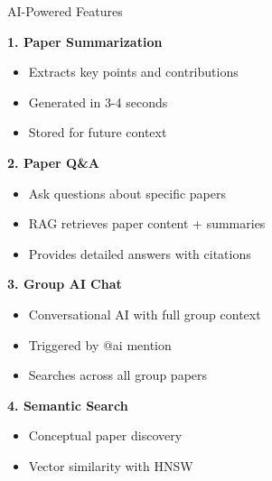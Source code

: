 \documentclass{beamer}
\begin{document}
\begin{frame}{AI-Powered Features}

\textbf{1. Paper Summarization}
\begin{itemize}
    \item Extracts key points and contributions
    \item Generated in 3-4 seconds
    \item Stored for future context
\end{itemize}

\vspace{0.2cm}

\textbf{2. Paper Q\&A}
\begin{itemize}
    \item Ask questions about specific papers
    \item RAG retrieves paper content + summaries
    \item Provides detailed answers with citations
\end{itemize}

\vspace{0.2cm}

\textbf{3. Group AI Chat}
\begin{itemize}
    \item Conversational AI with full group context
    \item Triggered by @ai mention
    \item Searches across all group papers
\end{itemize}

\vspace{0.2cm}

\textbf{4. Semantic Search}
\begin{itemize}
    \item Conceptual paper discovery
    \item Vector similarity with HNSW
\end{itemize}

\end{frame}
\end{document}
